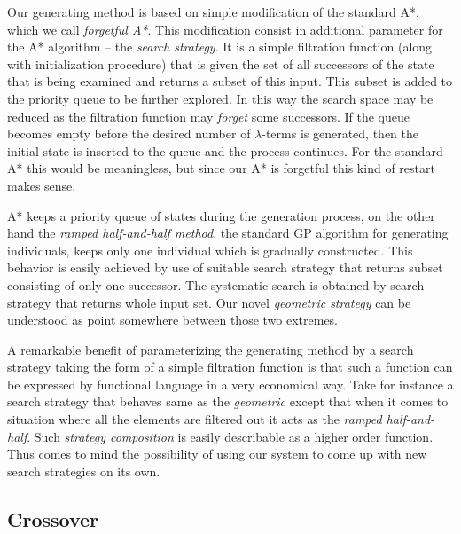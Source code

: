 \documentclass[11pt]{article}
\newcommand{\lterms}{$\lambda$-terms\xspace}
\begin{document}
\begin{article}
Our generating method is based on simple modification of the
standard A*, which we call \textit{forgetful A*}. This modification consist in 
additional parameter for the A* algorithm -- the \textit{search strategy}. 
It is a simple filtration function (along with initialization procedure)
that is given the set of all successors of the state that is being examined
and returns a subset of this input. This subset is added to the priority queue 
to be further explored. In this way the search space may be reduced as 
the filtration function may \textit{forget} some successors.
If the queue becomes empty before the desired number of \lterms
is generated, then the initial state is inserted to the queue
and the process continues. For the standard A* this would be meaningless,
but since our A* is forgetful this kind of restart makes sense.

A* keeps a priority queue of states during the generation process,
on the other hand the \textit{ramped half-and-half method}, 
the standard GP algorithm for generating individuals, 
keeps only one individual which is gradually constructed. This 
behavior is easily achieved by use of suitable search strategy 
that returns subset consisting of only one successor.
The systematic search is obtained by search strategy that 
returns whole input set.      
Our novel \textit{geometric strategy} can be understood as
point somewhere between those two extremes.




A remarkable benefit of parameterizing the generating method 
by a search strategy taking the form of a simple filtration function
is that such a function can be expressed by functional language in a very 
economical way. Take for instance a search strategy that behaves same
as the \textit{geometric} except that when it comes to 
situation where all the elements are filtered out it
acts as the \textit{ramped half-and-half}. 
Such \textit{strategy composition}
is easily describable as a higher order function. Thus comes 
to mind the possibility of using our system to come up with new
search strategies on its own.


\subsection{Crossover}




\end{article}
\end{document}
